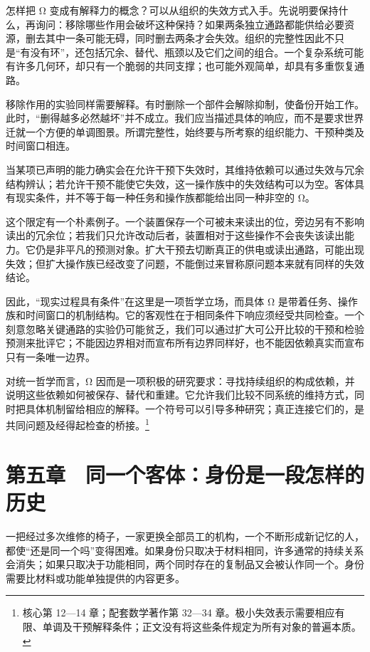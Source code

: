 \documentclass[
  11pt,
  oneside]{book}
\begin{document}
怎样把 Ω 变成有解释力的概念？可以从组织的失效方式入手。先说明要保持什么，再询问：移除哪些作用会破坏这种保持？如果两条独立通路都能供给必要资源，删去其中一条可能无碍，同时删去两条才会失效。组织的完整性因此不只是``有没有环''，还包括冗余、替代、瓶颈以及它们之间的组合。一个复杂系统可能有许多几何环，却只有一个脆弱的共同支撑；也可能外观简单，却具有多重恢复通路。

移除作用的实验同样需要解释。有时删除一个部件会解除抑制，使备份开始工作。此时，``删得越多必然越坏''并不成立。我们应当描述具体的响应，而不是要求世界迁就一个方便的单调图景。所谓完整性，始终要与所考察的组织能力、干预种类及时间窗口相连。

当某项已声明的能力确实会在允许干预下失效时，其维持依赖可以通过失效与冗余结构辨认；若允许干预不能使它失效，这一操作族中的失效结构可以为空。客体具有现实条件，并不等于每一种任务和操作族都能给出同一种非空的 Ω。

这个限定有一个朴素例子。一个装置保存一个可被未来读出的位，旁边另有不影响读出的冗余位；若我们只允许改动后者，装置相对于这些操作不会丧失该读出能力。它仍是非平凡的预测对象。扩大干预去切断真正的供电或读出通路，可能出现失效；但扩大操作族已经改变了问题，不能倒过来冒称原问题本来就有同样的失效结论。

因此，``现实过程具有条件''在这里是一项哲学立场，而具体 Ω 是带着任务、操作族和时间窗口的机制结构。它的客观性在于相同条件下响应须经受共同检查。一个刻意忽略关键通路的实验仍可能贫乏，我们可以通过扩大可公开比较的干预和检验预测来批评它；不能因边界相对而宣布所有边界同样好，也不能因依赖真实而宣布只有一条唯一边界。

\begingroup{}

对统一哲学而言，Ω 因而是一项积极的研究要求：寻找持续组织的构成依赖，并说明这些依赖如何被保存、替代和重建。它允许我们比较不同系统的维持方式，同时把具体机制留给相应的解释。一个符号可以引导多种研究；真正连接它们的，是共同问题及经得起检查的桥接。\footnote{\hypertarget{ph-note-11}{}核心第 12---14 章；配套数学著作第 32---34 章。极小失效表示需要相应有限、单调及干预解释条件；正文没有将这些条件规定为所有对象的普遍本质。}

\par\endgroup

\chapter{第五章　同一个客体：身份是一段怎样的历史}\label{ph-ch-05}

一把经过多次维修的椅子，一家更换全部员工的机构，一个不断形成新记忆的人，都使``还是同一个吗''变得困难。如果身份只取决于材料相同，许多通常的持续关系会消失；如果只取决于功能相同，两个同时存在的复制品又会被认作同一个。身份需要比材料或功能单独提供的内容更多。
\end{document}

